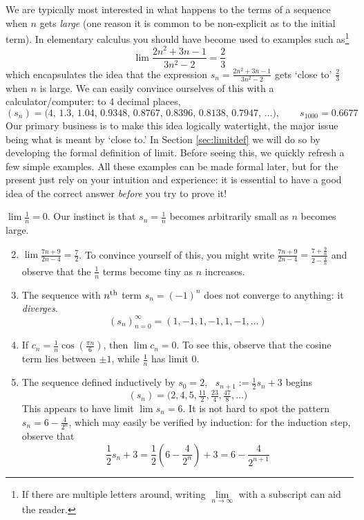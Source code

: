We are typically most interested in what happens to the terms of a sequence when $n$ gets \emph{large} (one reason it is common to be non-explicit as to the initial term). In elementary calculus you should have become used to examples such as\footnote{%
	If there are multiple letters around, writing $\lim\limits_{n\to\infty}$ with a subscript can aid the reader.%
}
\[
	\lim\frac{2n^2+3n-1}{3n^2-2}=\frac 23
\]
which encapsulates the idea that the expression $s_n=\frac{2n^2+3n-1}{3n^2-2}$ gets `close to' $\frac 23$ when $n$ is large. We can easily convince ourselves of this with a calculator/computer: to 4 decimal places,
\[
	(s_n)=\bigl(4,\,1.3,\,1.04,\,
 	0.9348,\,
 	0.8767,\,
 	0.8396,\,
 	0.8138,\,
 	0.7947,\,\ldots\bigr),\qquad 
 	s_{1000}=0.6677
\]
Our primary business is to make this idea logically watertight, the major issue being what is meant by `close to.' In Section \ref{sec:limitdef} we will do so by developing the formal definition of limit. Before seeing this, we quickly refresh a few simple examples. All these examples can be made formal later, but for the present just rely on your intuition and experience: it is essential to have a good idea of the correct answer \emph{before} you try to prove it!

\goodbreak

\begin{examples}{}{}
	\exstart $\lim \frac 1n=0$. Our instinct is that $s_n=\frac 1n$ becomes arbitrarily small as $n$ becomes large. 
	\begin{enumerate}\setcounter{enumi}{1}
	  \item $\lim\frac{7n+9}{2n-4}=\frac 72$. To convince yourself of this, you might write $\frac{7n+9}{2n-4}=\frac{7+\frac 9n}{2-\frac 4n}$
	  and observe that the $\frac 1n$ terms become tiny as $n$ increases.
	  \item The sequence with $n\textsuperscript{th}$ term $s_n=(-1)^n$ does not converge to anything: it \emph{diverges}.
	  \[
	  	(s_n)_{n=0}^\infty=(1,-1,1,-1,1,-1,\ldots)
	  \]
	  \item If $c_n=\frac 1n\cos\left(\frac{\pi n}6\right)$, then $\lim c_n=0$. To see this, observe that the cosine term lies between $\pm 1$, while $\frac 1n$ has limit 0.
	  \item The sequence defined inductively by $s_0=2$, \ $s_{n+1}:=\frac 12s_n+3$ begins
	  \[
	  	(s_n)=\bigl(2,4,5,\tfrac{11}2,\tfrac{23}4,\tfrac{47}8,\ldots\bigr)
	  \]
	  This appears to have limit $\lim s_n=6$. It is not hard to spot the pattern $s_n=6-\frac{4}{2^n}$, which may easily be verified by induction: for the induction step, observe that
	  \[
	  	\frac 12s_n+3=\frac 12\left(6-\frac 4{2^n}\right) +3 =6-\frac 4{2^{n+1}}
	  \]
	\end{enumerate}
\end{examples} 


